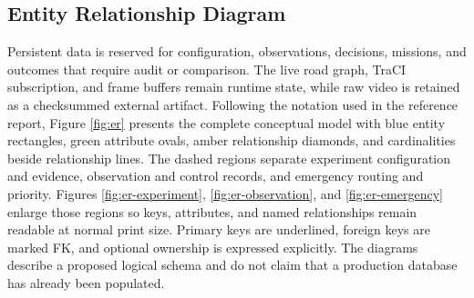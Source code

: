 \subsection{Entity Relationship Diagram}

Persistent data is reserved for configuration, observations, decisions, missions, and outcomes that require audit or comparison. The live road graph, TraCI subscription, and frame buffers remain runtime state, while raw video is retained as a checksummed external artifact. Following the notation used in the reference report, Figure \ref{fig:er} presents the complete conceptual model with blue entity rectangles, green attribute ovals, amber relationship diamonds, and cardinalities beside relationship lines. The dashed regions separate experiment configuration and evidence, observation and control records, and emergency routing and priority. Figures \ref{fig:er-experiment}, \ref{fig:er-observation}, and \ref{fig:er-emergency} enlarge those regions so keys, attributes, and named relationships remain readable at normal print size. Primary keys are underlined, foreign keys are marked FK, and optional ownership is expressed explicitly. The diagrams describe a proposed logical schema and do not claim that a production database has already been populated.


